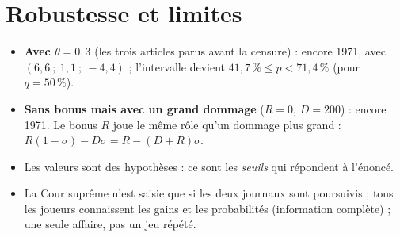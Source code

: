 \documentclass[11pt,a4paper]{article}
\theoremstyle{definition}
\begin{document}
\section{Robustesse et limites}
\begin{itemize}[leftmargin=*,itemsep=2pt]
\item \textbf{Avec $\theta=0{,}3$} (les trois articles parus avant la censure) : encore 1971, avec $(6{,}6\ ;\ 1{,}1\ ;\ -4{,}4)$ ; l'intervalle devient $41{,}7\,\%\le p<71{,}4\,\%$ (pour $q=50\,\%$).
\item \textbf{Sans bonus mais avec un grand dommage} ($R=0$, $D=200$) : encore 1971. Le bonus $R$ joue le même rôle qu'un dommage plus grand : $R(1-\sigma)-D\sigma=R-(D+R)\sigma$.
\item Les valeurs sont des hypothèses : ce sont les \emph{seuils} qui répondent à l'énoncé.
\item La Cour suprême n'est saisie que si les deux journaux sont poursuivis ; tous les joueurs connaissent les gains et les probabilités (information complète) ; une seule affaire, pas un jeu répété.
\end{itemize}
\end{document}
